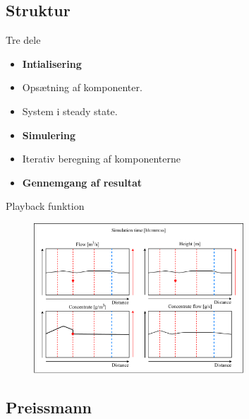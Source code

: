 \subsection{Struktur}
\begin{frame}{Tre dele}{}
\vfill\vfill\centering

\begin{itemize}
	\item \textbf{Intialisering}
	\item<1-> Opsætning af komponenter.
	\item<2-> System i steady state.
	\item<3-> \textbf{Simulering}
	\item<4-> Iterativ beregning af komponenterne
	\item<5-> \textbf{Gennemgang af resultat}
\end{itemize}

\vfill\vfill		
\end{frame}

\begin{frame}{Playback funktion}{}
\vfill\vfill\centering
		\begin{figure}[H]
			\centering
			\includegraphics[width=0.7\textwidth]{Sections/pictures/display_results.pdf}
		\end{figure}
\vfill\vfill		
\end{frame}

\subsection{Preissmann}

